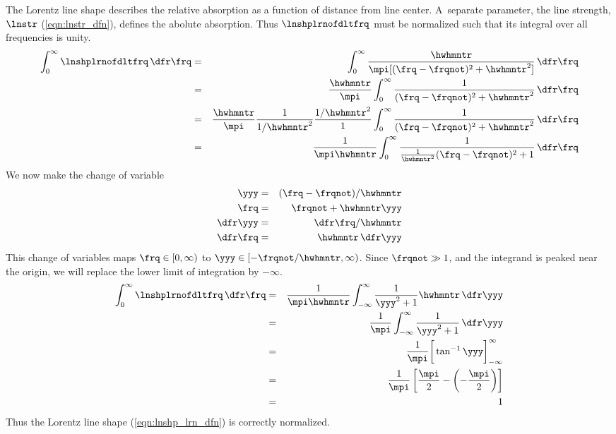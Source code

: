 \documentclass[12pt]{article}
\begin{document}
The Lorentz line shape describes the relative absorption as a function 
of distance from line center.
A~separate parameter, the line strength, $\lnstr$
(\ref{eqn:lnstr_dfn}), defines the abolute absorption. 
Thus $\lnshplrnofdltfrq$ must be normalized such that its integral over
all frequencies is unity.
\begin{eqnarray}
\int_{0}^{\infty} \lnshplrnofdltfrq \,\dfr\frq
& = & \int_{0}^{\infty} 
\frac{\hwhmntr}{\mpi [ (\frq - \frqnot)^{2} + \hwhmntr^{2} ] } \,\dfr\frq
\nonumber \\
& = & \frac{\hwhmntr}{\mpi} \int_{0}^{\infty} 
\frac{1}{(\frq - \frqnot)^{2} + \hwhmntr^{2}} \,\dfr\frq
\nonumber \\
& = & \frac{\hwhmntr}{\mpi} \frac{1}{1/\hwhmntr^{2}} \frac{1/\hwhmntr^{2}}{1} 
\int_{0}^{\infty} 
\frac{1}{(\frq - \frqnot)^{2} + \hwhmntr^{2}} \,\dfr\frq
\nonumber \\
& = & \frac{1}{\mpi \hwhmntr} \int_{0}^{\infty}
\frac{1}{\frac{1}{\hwhmntr^{2}}(\frq - \frqnot)^{2} + 1} \,\dfr\frq
\nonumber 
\end{eqnarray}
We now make the change of variable 
\begin{eqnarray}
\yyy & = & (\frq - \frqnot)/\hwhmntr \nonumber \\
\frq & = & \frqnot + \hwhmntr \yyy \nonumber \\
\dfr\yyy & = &  \dfr\frq / \hwhmntr \nonumber \\
\dfr\frq & = & \hwhmntr \,\dfr\yyy \nonumber
\label{eqn:cov_y}
\end{eqnarray}
This change of variables maps $\frq \in [0,\infty)$ to 
$\yyy \in [-\frqnot/\hwhmntr,\infty)$.
Since $\frqnot \gg 1$, and the integrand is peaked near the origin,
we will replace the lower limit of integration by $-\infty$.
\begin{eqnarray}
\int_{0}^{\infty} \lnshplrnofdltfrq \,\dfr\frq
& = & 
\frac{1}{\mpi \hwhmntr} \int_{-\infty}^{\infty} 
\frac{1}{\yyy^{2} + 1} \hwhmntr \,\dfr\yyy \nonumber \\
& = & 
\frac{1}{\mpi} \int_{-\infty}^{\infty} 
\frac{1}{\yyy^{2} + 1} \,\dfr\yyy \nonumber \\
& = & 
\frac{1}{\mpi} \bigg[ \tan^{-1} \yyy \bigg]_{-\infty}^{\infty} \nonumber \\
& = & 
\frac{1}{\mpi} \left[ \frac{\mpi}{2} - \left( - \frac{\mpi}{2} \right) \right] \nonumber \\
& = & 1
\label{eqn:lnshplrn_ntr_nrm}
\end{eqnarray}
Thus the Lorentz line shape (\ref{eqn:lnshp_lrn_dfn}) is
correctly normalized. 
\end{document}

